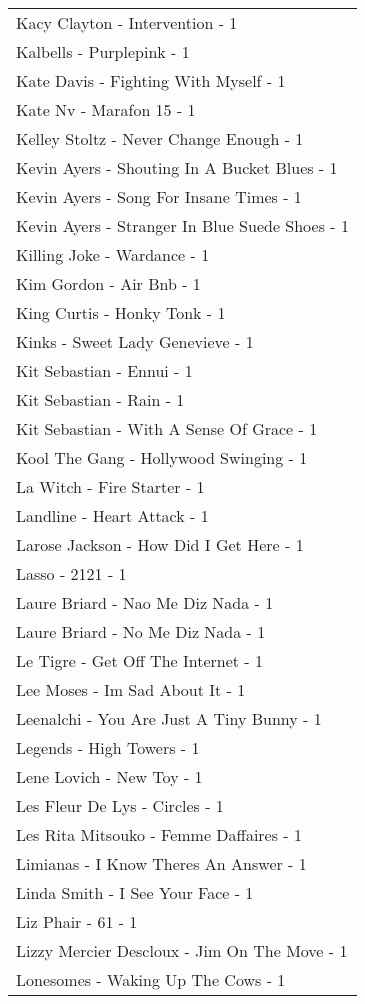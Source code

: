 \documentclass[
]{article}
\begin{document}
\begin{longtable}{l}
Kacy Clayton - Intervention - 1 \\ 
Kalbells - Purplepink - 1 \\ 
Kate Davis - Fighting With Myself - 1 \\ 
Kate Nv - Marafon 15 - 1 \\ 
Kelley Stoltz - Never Change Enough - 1 \\ 
Kevin Ayers - Shouting In A Bucket Blues - 1 \\ 
Kevin Ayers - Song For Insane Times - 1 \\ 
Kevin Ayers - Stranger In Blue Suede Shoes - 1 \\ 
Killing Joke - Wardance - 1 \\ 
Kim Gordon - Air Bnb - 1 \\ 
King Curtis - Honky Tonk - 1 \\ 
Kinks - Sweet Lady Genevieve - 1 \\ 
Kit Sebastian - Ennui - 1 \\ 
Kit Sebastian - Rain - 1 \\ 
Kit Sebastian - With A Sense Of Grace - 1 \\ 
Kool The Gang - Hollywood Swinging - 1 \\ 
La Witch - Fire Starter - 1 \\ 
Landline - Heart Attack - 1 \\ 
Larose Jackson - How Did I Get Here - 1 \\ 
Lasso - 2121 - 1 \\ 
Laure Briard - Nao Me Diz Nada - 1 \\ 
Laure Briard - No Me Diz Nada - 1 \\ 
Le Tigre - Get Off The Internet - 1 \\ 
Lee Moses - Im Sad About It - 1 \\ 
Leenalchi - You Are Just A Tiny Bunny - 1 \\ 
Legends - High Towers - 1 \\ 
Lene Lovich - New Toy - 1 \\ 
Les Fleur De Lys - Circles - 1 \\ 
Les Rita Mitsouko - Femme Daffaires - 1 \\ 
Limianas - I Know Theres An Answer - 1 \\ 
Linda Smith - I See Your Face - 1 \\ 
Liz Phair - 61 - 1 \\ 
Lizzy Mercier Descloux - Jim On The Move - 1 \\ 
Lonesomes - Waking Up The Cows - 1 \\ 

\end{longtable}
\end{document}
